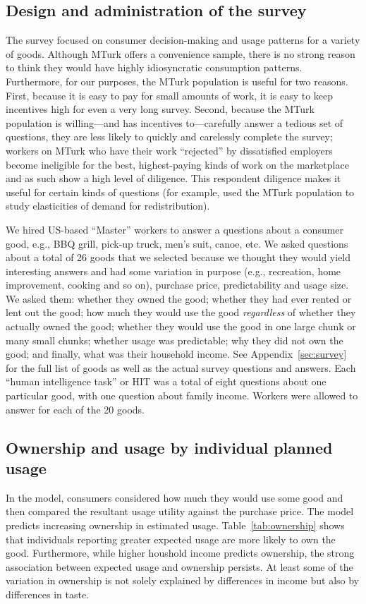 \documentclass[11pt]{article}
\begin{document}
\subsection{Design and administration of the survey}
The survey focused on consumer decision-making and usage patterns for a variety of goods. 
Although MTurk offers a convenience sample, there is no strong reason to think they would have highly idiosyncratic consumption patterns. 
Furthermore, for our purposes, the MTurk population is useful for two reasons. 
First, because it is easy to pay for small amounts of work, it is easy to keep incentives high for even a very long survey. 
Second, because the MTurk population is willing---and has incentives to---carefully answer a tedious set of questions, they are less likely to quickly and carelessly complete the survey; 
workers on MTurk who have their work ``rejected'' by dissatisfied employers become ineligible for the best, highest-paying kinds of work on the marketplace and as such show a high level of diligence.    
This respondent diligence makes it useful for certain kinds of questions (for example, \cite{kuziemko2013elastic} used the MTurk population to study elasticities of demand for redistribution).  

We hired US-based ``Master'' workers to answer a questions about a consumer good, e.g., BBQ grill, pick-up truck, men's suit, canoe, etc.
We asked questions about a total of 26 goods that we selected because we thought they would yield interesting answers and had some variation in purpose (e.g., recreation, home improvement, cooking and so on), purchase price, predictability and usage size. 
We asked them: whether they owned the good; whether they had ever rented or lent out the good; how much they would use the good \emph{regardless} of whether they actually owned the good; whether they would use the good in one large chunk or many small chunks; whether usage was predictable; why they did not own the good; and finally, what was their household income. 
See Appendix~\ref{sec:survey} for the full list of goods as well as the actual survey questions and answers.  
Each ``human intelligence task'' or HIT was a total of eight questions about one particular good, with one question about family income. 
Workers were allowed to answer for each of the 20 goods.  

\subsection{Ownership and usage by individual planned usage} 
In the model, consumers considered how much they would use some good and then compared the resultant usage utility against the purchase price. 
The model predicts increasing ownership in estimated usage.
Table~\ref{tab:ownership} shows that individuals reporting greater expected usage are more likely to own the good.
Furthermore, while higher houshold income predicts ownership, the strong association between expected usage and ownership persists.
At least some of the variation in ownership is not solely explained by differences in income but also by differences in taste. 
\end{document}
